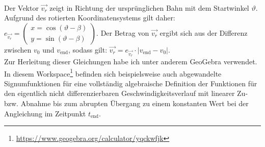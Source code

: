 \\
Der Vektor $\vec{v_r}$ zeigt in Richtung der ursprünglichen Bahn mit dem Startwinkel $\vartheta$. Aufgrund des rotierten Koordinatensystems gilt daher: $e_{\vec{v_r}} = \left( \begin{smallmatrix} x = \cos(\vartheta-\beta) \\ y = \sin(\vartheta-\beta) \end{smallmatrix} \right)$. Der Betrag von $\vec{v_r}$ ergibt sich aus der Differenz zwischen $v_0$ und $v_{\text{end}}$, sodass gilt: $\vec{v_r} = e_{\vec{v_r}} \cdot |v_{\text{end}} - v_0|$.
\\
Zur Herleitung dieser Gleichungen habe ich unter anderem GeoGebra verwendet. In diesem Workspace\footnote{\url{https://www.geogebra.org/calculator/yqckwfjk}} befinden sich beispielsweise auch abgewandelte Signumfunktionen für eine vollständig algebraische Definition der Funktionen für den eigentlich nicht differenzierbaren Geschwindigkeitsverlauf mit linearer Zu- bzw. Abnahme bis zum abrupten Übergang zu einem konstanten Wert bei der Angleichung im Zeitpunkt $t_{\text{end}}$. 
